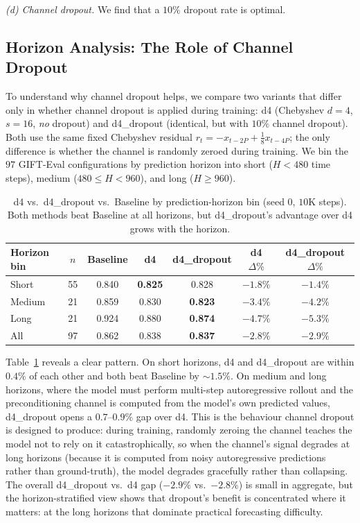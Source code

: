 \documentclass[11pt]{article}
\theoremstyle{plain}
\theoremstyle{definition}
\theoremstyle{remark}
\newcommand{\HD}{\textsf{d4\_dropout}}
\newcommand{\Dnodrop}{\textsf{d4}}
\newcommand{\Baseline}{\textsf{Baseline}}
\begin{document}
\emph{(d) Channel dropout.} We find that a $10\%$ dropout rate is optimal.

\subsection{Horizon Analysis: The Role of Channel Dropout}

To understand why channel dropout helps, we compare two variants that differ only in whether channel dropout is applied during training: \Dnodrop{} (Chebyshev $d=4$, $s=16$, \emph{no} dropout) and \HD{} (identical, but with $10\%$ channel dropout). Both use the same fixed Chebyshev residual $r_t = -x_{t-2P} + \tfrac{1}{8} x_{t-4P}$; the only difference is whether the channel is randomly zeroed during training. We bin the $97$ GIFT-Eval configurations by prediction horizon into short ($H < 480$ time steps), medium ($480 \leq H < 960$), and long ($H \geq 960$).

\begin{table}[h]
\centering
\caption{\Dnodrop{} vs.\ \HD{} vs.\ \Baseline{} by prediction-horizon bin (seed 0, $10$K steps). Both methods beat \Baseline{} at all horizons, but \HD{}'s advantage over \Dnodrop{} grows with the horizon.}
\label{tab:horizon}
\small
\begin{tabular}{lcccccc}
\toprule
\textbf{Horizon bin} & \textbf{$n$} & \textbf{\Baseline{}} & \textbf{\Dnodrop{}} & \textbf{\HD{}} & \textbf{\Dnodrop{} $\Delta\%$} & \textbf{\HD{} $\Delta\%$} \\
\midrule
Short  & 55 & 0.840 & \textbf{0.825} & 0.828 & $-1.8\%$ & $-1.4\%$ \\
Medium & 21 & 0.859 & 0.830 & \textbf{0.823} & $-3.4\%$ & $-4.2\%$ \\
Long   & 21 & 0.924 & 0.880 & \textbf{0.874} & $-4.7\%$ & $-5.3\%$ \\
\midrule
All    & 97 & 0.862 & 0.838 & \textbf{0.837} & $-2.8\%$ & $-2.9\%$ \\
\bottomrule
\end{tabular}
\end{table}

Table~\ref{tab:horizon} reveals a clear pattern. On short horizons, \Dnodrop{} and \HD{} are within $0.4\%$ of each other and both beat \Baseline{} by $\sim 1.5\%$. On medium and long horizons, where the model must perform multi-step autoregressive rollout and the preconditioning channel is computed from the model's own predicted values, \HD{} opens a $0.7$--$0.9\%$ gap over \Dnodrop{}. This is the behaviour channel dropout is designed to produce: during training, randomly zeroing the channel teaches the model not to rely on it catastrophically, so when the channel's signal degrades at long horizons (because it is computed from noisy autoregressive predictions rather than ground-truth), the model degrades gracefully rather than collapsing. The overall \HD{} vs.\ \Dnodrop{} gap ($-2.9\%$ vs.\ $-2.8\%$) is small in aggregate, but the horizon-stratified view shows that dropout's benefit is concentrated where it matters: at the long horizons that dominate practical forecasting difficulty.
\end{document}

